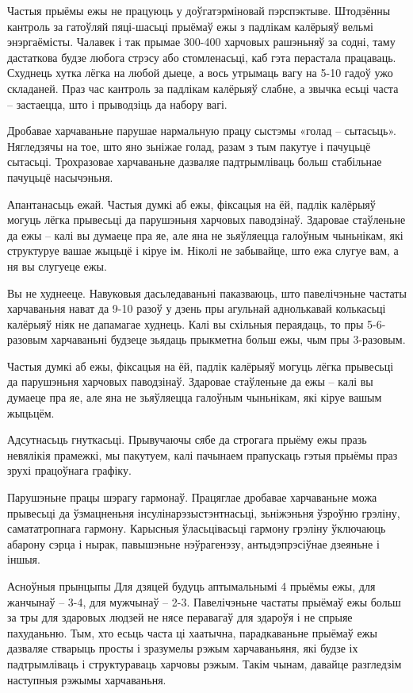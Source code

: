 Частыя прыёмы ежы не працуюць у доўгатэрміновай пэрспэктыве. Штодзённы кантроль за гатоўляй пяці-шасьці прыёмаў ежы з падлікам калёрыяў вельмі энэргаёмісты. Чалавек і так прымае 300-400 харчовых рашэньняў за содні, таму дастаткова будзе любога стрэсу або стомленасьці, каб гэта перастала працаваць. Схуднець хутка лёгка на любой дыеце, а вось утрымаць вагу на 5-10 гадоў ужо складаней. Праз час кантроль за падлікам калёрыяў слабне, а звычка есьці часта – застаецца, што і прыводзіць да набору вагі.

Дробавае харчаваньне парушае нармальную працу сыстэмы «голад – сытасьць». Нягледзячы на тое, што яно зьніжае голад, разам з тым пакутуе і пачуцьцё сытасьці. Трохразовае харчаваньне дазваляе падтрымліваць больш стабільнае пачуцьцё насычэньня.

Апантанасьць ежай.
Частыя думкі аб ежы, фіксацыя на ёй, падлік калёрыяў могуць лёгка прывесьці да парушэньня харчовых паводзінаў. Здаровае стаўленьне да ежы – калі вы думаеце пра яе, але яна не зьяўляецца галоўным чыньнікам, які структуруе вашае жыцьцё і кіруе ім. Ніколі не забывайце, што ежа слугуе вам, а ня вы слугуеце ежы.

Вы не худнееце.
Навуковыя дасьледаваньні паказваюць, што павелічэньне частаты харчаваньня нават да 9-10 разоў у дзень пры агульнай аднолькавай колькасьці калёрыяў ніяк не дапамагае худнець. Калі вы схільныя пераядаць, то пры 5-6-разовым харчаваньні будзеце зьядаць прыкметна больш ежы, чым пры 3-разовым.

Частыя думкі аб ежы, фіксацыя на ёй, падлік калёрыяў могуць лёгка прывесьці да парушэньня харчовых паводзінаў. Здаровае стаўленьне да ежы – калі вы думаеце пра яе, але яна не зьяўляецца галоўным чыньнікам, які кіруе вашым жыцьцём.

Адсутнасьць гнуткасьці.
Прывучаючы сябе да строгага прыёму ежы празь невялікія прамежкі, мы пакутуем, калі пачынаем прапускаць гэтыя прыёмы праз зрухі працоўнага графіку.

Парушэньне працы шэрагу гармонаў.
Працяглае дробавае харчаваньне можа прывесьці да ўзмацненьня інсулінарэзыстэнтнасьці, зьніжэньня ўзроўню грэліну, самататропнага гармону. Карысныя ўласьцівасьці гармону грэліну ўключаюць абарону сэрца і нырак, павышэньне нэўрагенэзу, антыдэпрэсіўнае дзеяньне і іншыя.

Асноўныя прынцыпы
Для дзяцей будуць аптымальнымі 4 прыёмы ежы, для жанчынаў – 3-4, для мужчынаў – 2-3. Павелічэньне частаты прыёмаў ежы больш за тры для здаровых людзей не нясе перавагаў для здароўя і не спрыяе пахуданьню. Тым, хто есьць часта ці хаатычна, парадкаваньне прыёмаў ежы дазваляе стварыць просты і зразумелы рэжым харчаваньяня, які будзе іх падтрымліваць і структураваць харчовы рэжым. Такім чынам, давайце разгледзім наступныя рэжымы харчаваньня.


